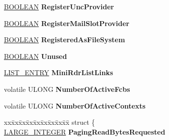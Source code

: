 \begin{DoxyCompactItemize}
\hyperlink{_processor_bind_8h_a112e3146cb38b6ee95e64d85842e380a}{B\+O\+O\+L\+E\+AN} {\bfseries Register\+Unc\+Provider}
\item 
\mbox{\label{struct___r_d_b_s_s___d_e_v_i_c_e___o_b_j_e_c_t_a2ff827e87c4edf04a0b2973f32396862}} 
\hyperlink{_processor_bind_8h_a112e3146cb38b6ee95e64d85842e380a}{B\+O\+O\+L\+E\+AN} {\bfseries Register\+Mail\+Slot\+Provider}
\item 
\mbox{\label{struct___r_d_b_s_s___d_e_v_i_c_e___o_b_j_e_c_t_aefb98250c86b73c9c4efb5521cf821e5}} 
\hyperlink{_processor_bind_8h_a112e3146cb38b6ee95e64d85842e380a}{B\+O\+O\+L\+E\+AN} {\bfseries Registered\+As\+File\+System}
\item 
\mbox{\label{struct___r_d_b_s_s___d_e_v_i_c_e___o_b_j_e_c_t_ae6c9478c8151790057818726287f9833}} 
\hyperlink{_processor_bind_8h_a112e3146cb38b6ee95e64d85842e380a}{B\+O\+O\+L\+E\+AN} {\bfseries Unused}
\item 
\mbox{\label{struct___r_d_b_s_s___d_e_v_i_c_e___o_b_j_e_c_t_aef1e25b796738812cff9fafdf8fa961d}} 
\hyperlink{struct___l_i_s_t___e_n_t_r_y}{L\+I\+S\+T\+\_\+\+E\+N\+T\+RY} {\bfseries Mini\+Rdr\+List\+Links}
\item 
\mbox{\label{struct___r_d_b_s_s___d_e_v_i_c_e___o_b_j_e_c_t_ab5fbf98a48f7b58dbc601834690c0065}} 
volatile U\+L\+O\+NG {\bfseries Number\+Of\+Active\+Fcbs}
\item 
\mbox{\label{struct___r_d_b_s_s___d_e_v_i_c_e___o_b_j_e_c_t_a5afc4d0e95f46bfef9d90a0fe7b2df4d}} 
volatile U\+L\+O\+NG {\bfseries Number\+Of\+Active\+Contexts}
\item 
\mbox{\label{struct___r_d_b_s_s___d_e_v_i_c_e___o_b_j_e_c_t_ad85f01d1217967ea51864a915805bafc}} 
\begin{tabbing}
xx\=xx\=xx\=xx\=xx\=xx\=xx\=xx\=xx\=\kill
struct \{\\
\>\hyperlink{union___l_a_r_g_e___i_n_t_e_g_e_r}{LARGE\_INTEGER} {\bfseries PagingReadBytesRequested}\\

\end{tabbing}
\end{DoxyCompactItemize}
